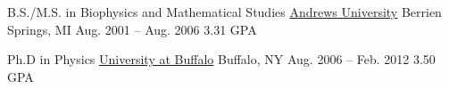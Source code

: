 

\begin{cventries}

  \cventry
    {B.S./M.S. in Biophysics and Mathematical Studies} %
    {\href{www.andrews.edu}{Andrews University}}       %
    {Berrien Springs, MI}                              %
    {Aug. 2001 -- Aug. 2006}                           %
    {3.31 GPA}                                         %

  \cventry
    {Ph.D in Physics}                                  %
    {\href{www.buffalo.edu}{University at Buffalo}}    %
    {Buffalo, NY}                                      %
    {Aug. 2006 -- Feb. 2012}                           %
    {3.50 GPA} 		                               %

\end{cventries}

